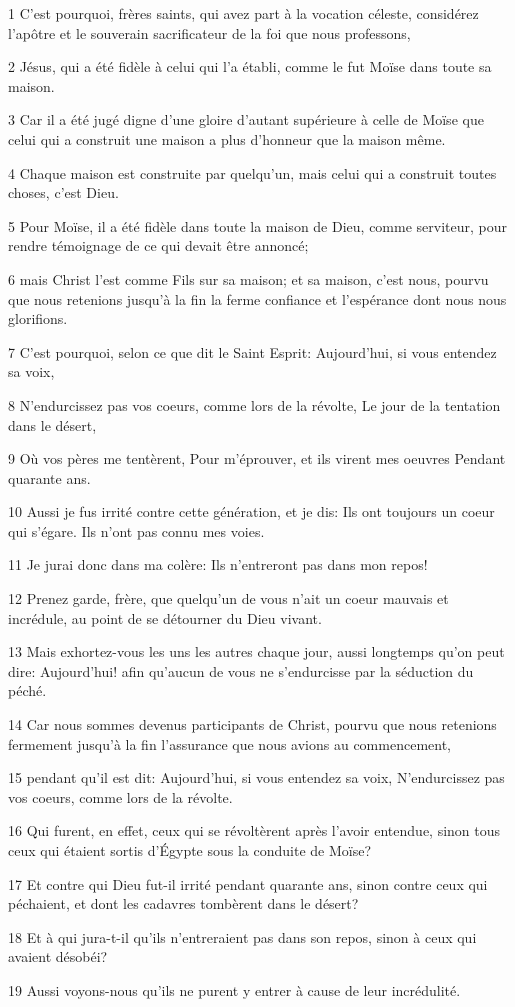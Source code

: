 \par 1 C'est pourquoi, frères saints, qui avez part à la vocation céleste, considérez l'apôtre et le souverain sacrificateur de la foi que nous professons,
\par 2 Jésus, qui a été fidèle à celui qui l'a établi, comme le fut Moïse dans toute sa maison.
\par 3 Car il a été jugé digne d'une gloire d'autant supérieure à celle de Moïse que celui qui a construit une maison a plus d'honneur que la maison même.
\par 4 Chaque maison est construite par quelqu'un, mais celui qui a construit toutes choses, c'est Dieu.
\par 5 Pour Moïse, il a été fidèle dans toute la maison de Dieu, comme serviteur, pour rendre témoignage de ce qui devait être annoncé;
\par 6 mais Christ l'est comme Fils sur sa maison; et sa maison, c'est nous, pourvu que nous retenions jusqu'à la fin la ferme confiance et l'espérance dont nous nous glorifions.
\par 7 C'est pourquoi, selon ce que dit le Saint Esprit: Aujourd'hui, si vous entendez sa voix,
\par 8 N'endurcissez pas vos coeurs, comme lors de la révolte, Le jour de la tentation dans le désert,
\par 9 Où vos pères me tentèrent, Pour m'éprouver, et ils virent mes oeuvres Pendant quarante ans.
\par 10 Aussi je fus irrité contre cette génération, et je dis: Ils ont toujours un coeur qui s'égare. Ils n'ont pas connu mes voies.
\par 11 Je jurai donc dans ma colère: Ils n'entreront pas dans mon repos!
\par 12 Prenez garde, frère, que quelqu'un de vous n'ait un coeur mauvais et incrédule, au point de se détourner du Dieu vivant.
\par 13 Mais exhortez-vous les uns les autres chaque jour, aussi longtemps qu'on peut dire: Aujourd'hui! afin qu'aucun de vous ne s'endurcisse par la séduction du péché.
\par 14 Car nous sommes devenus participants de Christ, pourvu que nous retenions fermement jusqu'à la fin l'assurance que nous avions au commencement,
\par 15 pendant qu'il est dit: Aujourd'hui, si vous entendez sa voix, N'endurcissez pas vos coeurs, comme lors de la révolte.
\par 16 Qui furent, en effet, ceux qui se révoltèrent après l'avoir entendue, sinon tous ceux qui étaient sortis d'Égypte sous la conduite de Moïse?
\par 17 Et contre qui Dieu fut-il irrité pendant quarante ans, sinon contre ceux qui péchaient, et dont les cadavres tombèrent dans le désert?
\par 18 Et à qui jura-t-il qu'ils n'entreraient pas dans son repos, sinon à ceux qui avaient désobéi?
\par 19 Aussi voyons-nous qu'ils ne purent y entrer à cause de leur incrédulité.

